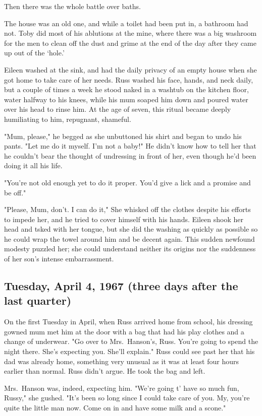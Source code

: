 Then there was the whole battle over baths.

The house was an old one, and while a toilet had been put in, a bathroom had not. Toby did most of his ablutions at the mine, where there was a big washroom for the men to clean off the dust and grime at the end of the day after they came up out of the `hole.'

Eileen washed at the sink, and had the daily privacy of an empty house when she got home to take care of her needs. Russ washed his face, hands, and neck daily, but a couple of times a week he stood naked in a washtub on the kitchen floor, water halfway to his knees, while his mum soaped him down and poured water over his head to rinse him. At the age of seven, this ritual became deeply humiliating to him, repugnant, shameful.

"Mum, please," he begged as she unbuttoned his shirt and began to undo his pants. "Let me do it myself. I'm not a baby!" He didn't know how to tell her that he couldn't bear the thought of undressing in front of her, even though he'd been doing it all his life.

"You're not old enough yet to do it proper. You'd give a lick and a promise and be off."

"Please, Mum, don't. I can do it," She whisked off the clothes despite his efforts to impede her, and he tried to cover himself with his hands. Eileen shook her head and tsked with her tongue, but she did the washing as quickly as possible so he could wrap the towel around him and be decent again. This sudden newfound modesty puzzled her; she could understand neither its origins nor the suddenness of her son's intense embarrassment.

\subsection{Tuesday, April 4, 1967 (three days after the last quarter)}

On the first Tuesday in April, when Russ arrived home from school, his dressing gowned mum met him at the door with a bag that had his play clothes and a change of underwear. "Go over to Mrs.~Hanson's, Russ. You're going to spend the night there. She's expecting you. She'll explain." Russ could see past her that his dad was already home, something very unusual as it was at least four hours earlier than normal. Russ didn't argue. He took the bag and left.

Mrs.~Hanson was, indeed, expecting him. "We're going t' have so much fun, Russy," she gushed. "It's been so long since I could take care of you. My, you're quite the little man now. Come on in and have some milk and a scone."

